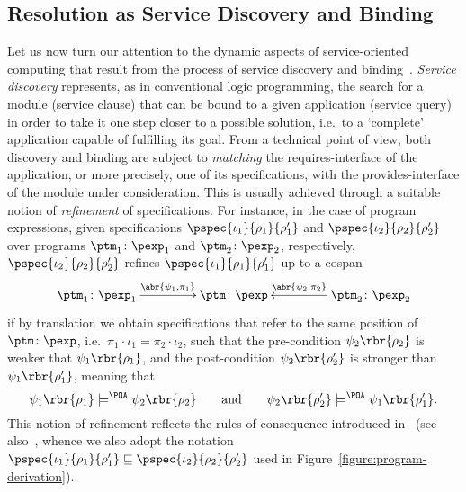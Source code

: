 \documentclass{LMCS}
\begin{document}
  \subsection{Resolution as Service Discovery and Binding}
  \label{subsection:resolution-as-service-discovery-and-binding}

  Let us now turn our attention to the dynamic aspects of service-oriented computing that result from the process of service discovery and binding~\cite{Fiadeiro-Lopes-Bocchi:An-abstract-model-for-service-discovery-and-binding-2011}.
  \emph{Service discovery} represents, as in conventional logic programming, the search for a module (service clause) that can be bound to a given application (service query) in order to take it one step closer to a possible solution, i.e.\ to a `complete' application capable of fulfilling its goal.
  From a technical point of view, both discovery and binding are subject to \emph{matching} the requires-interface of the application, or more precisely, one of its specifications, with the provides-interface of the module under consideration.
  This is usually achieved through a suitable notion of \emph{refinement} of specifications.
  For instance, in the case of program expressions, given specifications \(\pspec{\iota_{1}}{\rho_{1}}{\rho_{1}'}\) and \(\pspec{\iota_{2}}{\rho_{2}}{\rho_{2}'}\) over programs \(\ptm_{1} \colon \pexp_{1}\) and \(\ptm_{2} \colon \pexp_{2}\), respectively, \(\pspec{\iota_{2}}{\rho_{2}}{\rho_{2}'}\) refines \(\pspec{\iota_{1}}{\rho_{1}}{\rho_{1}'}\) up to a cospan
  \[
  \xymatrix @C+2em {
    {\ptm_{1} \colon \pexp_{1}}
    \ar [r] ^-{\abr{\psi_{1}, \pi_{1}}}
    & {\ptm \colon \pexp}
    & {\ptm_{2} \colon \pexp_{2}}
    \ar [l] _-{\abr{\psi_{2}, \pi_{2}}}
  }
  \]
  if by translation we obtain specifications that refer to the same position of \(\ptm \colon \pexp\), i.e.\ \(\pi_{1} \cdot \iota_{1} = \pi_{2} \cdot \iota_{2}\), such that the pre-condition \(\psi_{2}\rbr{\rho_{2}}\) is weaker that \(\psi_{1}\rbr{\rho_{1}}\), and the post-condition \(\psi_{2}\rbr{\rho_{2}'}\) is stronger than \(\psi_{1}\rbr{\rho_{1}'}\), meaning that
  \[
  \psi_{1}\rbr{\rho_{1}} \models^{\POA} \psi_{2}\rbr{\rho_{2}}
  \qquad \text{and} \qquad
  \psi_{2}\rbr{\rho_{2}'} \models^{\POA} \psi_{1}\rbr{\rho_{1}'}.
  \]
  This notion of refinement reflects the rules of consequence introduced in~\cite{Hoare:An-axiomatic-basis-for-computer-programming-1969} (see also~\cite{Morgan:Programming-from-Specifications-1994}, whence we also adopt the notation \(\pspec{\iota_{1}}{\rho_{1}}{\rho_{1}'} \sqsubseteq \pspec{\iota_{2}}{\rho_{2}}{\rho_{2}'}\) used in Figure~\ref{figure:program-derivation}).
\end{document}
